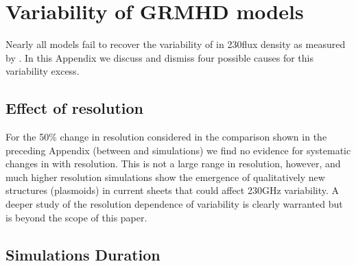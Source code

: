 \section{Variability of GRMHD models}\label{app:variability}

Nearly all models fail to recover the variability of \sgra in 230\GHz flux density as measured by .
In this Appendix we discuss and dismiss four possible causes for this variability excess.

\subsection{Effect of resolution}

For the 50\% change in resolution considered in the comparison shown in the preceding Appendix (between \kharma and \bhac simulations) we find no
evidence for systematic changes in  with resolution.  This is not a large
range in resolution, however, and much higher resolution simulations \citep{2022ApJ...924L..32R, 2020ApJ...900..100R, 2021arXiv211103689N}
show the emergence of qualitatively
new structures (plasmoids) in current sheets that could affect 230GHz variability.
A deeper study of the resolution dependence of variability is clearly warranted
but is beyond the scope of this paper.


\subsection{Simulations Duration}\label{app:narayan}

